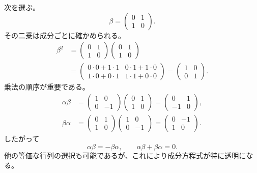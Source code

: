 次を選ぶ。
\begin{equation}
\beta=
\begin{pmatrix}
0&1\\
1&0
\end{pmatrix}.
\end{equation}
その二乗は成分ごとに確かめられる。
\begin{equation}
\begin{aligned}
\beta^2
&=
\begin{pmatrix}
0&1\\
1&0
\end{pmatrix}
\begin{pmatrix}
0&1\\
1&0
\end{pmatrix}\\
&=
\begin{pmatrix}
0\cdot0+1\cdot1&0\cdot1+1\cdot0\\
1\cdot0+0\cdot1&1\cdot1+0\cdot0
\end{pmatrix}
=
\begin{pmatrix}
1&0\\
0&1
\end{pmatrix}.
\end{aligned}
\end{equation}
乗法の順序が重要である。
\begin{align}
\alpha\beta
&=
\begin{pmatrix}
1&0\\
0&-1
\end{pmatrix}
\begin{pmatrix}
0&1\\
1&0
\end{pmatrix}
=
\begin{pmatrix}
0&1\\
-1&0
\end{pmatrix},\\
\beta\alpha
&=
\begin{pmatrix}
0&1\\
1&0
\end{pmatrix}
\begin{pmatrix}
1&0\\
0&-1
\end{pmatrix}
=
\begin{pmatrix}
0&-1\\
1&0
\end{pmatrix}.
\end{align}
したがって
\begin{equation}
\alpha\beta=-\beta\alpha,
\qquad
\alpha\beta+\beta\alpha=0.
\end{equation}
他の等価な行列の選択も可能であるが、これにより成分方程式が特に透明になる。


